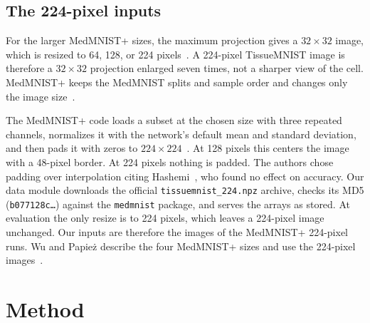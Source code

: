 \documentclass[conference]{IEEEtran}
\newif\ifanycitation
\let\citeAnyKey\cite
\renewcommand{\cite}{\global\anycitationtrue\citeAnyKey}
\begin{document}
\subsection{The 224-pixel inputs}
\label{sec:pixels}

For the larger MedMNIST+ sizes, the maximum projection gives a $32\times32$ image, which is
resized to 64, 128, or 224 pixels~\cite{yang2024medmnistplusnotes}. A 224-pixel TissueMNIST
image is therefore a $32\times32$ projection enlarged seven times, not a sharper view of
the cell. MedMNIST+ keeps the MedMNIST splits and sample order and changes only the image
size~\cite{yang2024medmnistplusnotes}.

The MedMNIST+ code loads a subset at the chosen size with three repeated channels,
normalizes it with the network's default mean and standard deviation, and then pads it
with zeros to $224\times224$~\cite{doerrich2025medmnistpluscode}. At 128 pixels this
centers the image with a 48-pixel border. At 224 pixels nothing is padded. The authors
chose padding over interpolation citing Hashemi~\cite{hashemi2019padding}, who found no
effect on accuracy. Our data module downloads the official \texttt{tissuemnist\_224.npz}
archive, checks its MD5 (\texttt{b077128c\ldots}) against the \texttt{medmnist} package,
and serves the arrays as stored. At evaluation the only resize is to 224 pixels, which
leaves a 224-pixel image unchanged. Our inputs are therefore the images of the MedMNIST+
224-pixel runs. Wu and Papie\.{z} describe the four MedMNIST+ sizes and use the 224-pixel
images~\cite{wu2025rethinking}.

\section{Method}
\label{sec:method}
\end{document}
